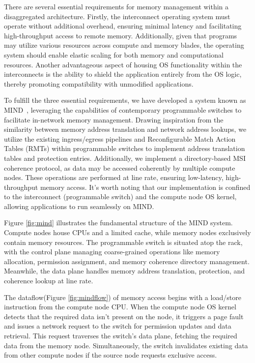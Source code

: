 There are several essential requirements for memory management within a disaggregated architecture. Firstly, the interconnect operating system must operate without additional overhead, ensuring minimal latency and facilitating high-throughput access to remote memory. Additionally, given that programs may utilize various resources across compute and memory blades, the operating system should enable elastic scaling for both memory and computational resources. Another advantageous aspect of housing OS functionality within the interconnects is the ability to shield the application entirely from the OS logic, thereby promoting compatibility with unmodified applications.

To fulfill the three essential requirements, we have developed a system known as MIND~\cite{mind}, leveraging the capabilities of contemporary programmable switches to facilitate in-network memory management. Drawing inspiration from the similarity between memory address translation and network address lookups, we utilize the existing ingress/egress pipelines and Reconfigurable Match Action Tables (RMTs)\cite{rmt} within programmable switches to implement address translation tables and protection entries. Additionally, we implement a directory-based MSI coherence protocol\cite{msi}, as data may be accessed coherently by multiple compute nodes. These operations are performed at line rate, ensuring low-latency, high-throughput memory access. It's worth noting that our implementation is confined to the interconnect (programmable switch) and the compute node OS kernel, allowing applications to run seamlessly on MIND.

Figure \ref{fig:mind} illustrates the fundamental structure of the MIND system. Compute nodes house CPUs and a limited cache, while memory nodes exclusively contain memory resources. The programmable switch is situated atop the rack, with the control plane managing coarse-grained operations like memory allocation, permission assignment, and memory coherence directory management. Meanwhile, the data plane handles memory address translation, protection, and coherence lookup at line rate.

The dataflow(Figure \ref{fig:mindflow}) of memory access begins with a load/store instruction from the compute node CPU. When the compute node OS kernel detects that the required data isn't present on the node, it triggers a page fault and issues a network request to the switch for permission updates and data retrieval. This request traverses the switch's data plane, fetching the required data from the memory node. Simultaneously, the switch invalidates existing data from other compute nodes if the source node requests exclusive access.

